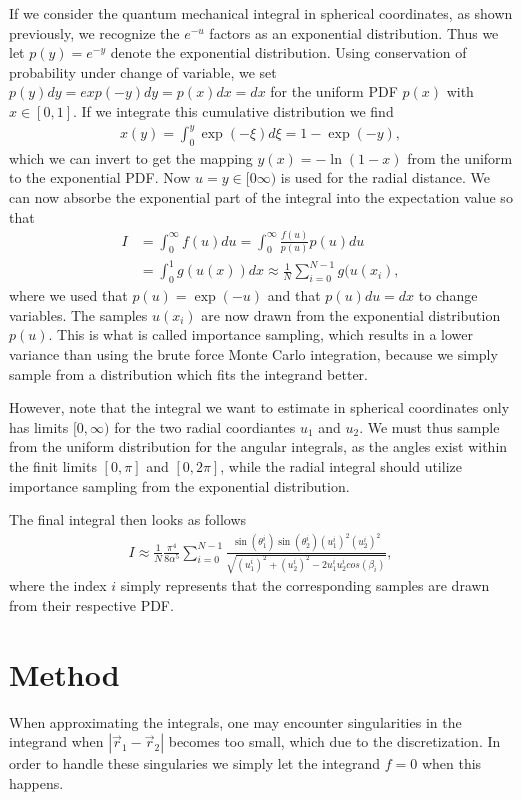 \documentclass[10pt, twocolumn]{aastex62}
\begin{document}
If we consider the quantum mechanical integral in spherical coordinates, as
shown previously, we recognize the $e^{-u}$ factors as an exponential
distribution. Thus we let $p(y) = e^{-y}$ denote the exponential distribution.
Using conservation of probability under change of variable, we set $p(y)dy =
exp(-y)dy = p(x)dx = dx$ for the uniform PDF $p(x)$ with $x\in[0,1]$. If we
integrate this cumulative distribution we find 
\begin{align}
	x(y) = \int^y_0 \exp(-\xi)d\xi = 1 - \exp(-y),
\end{align} 
which we can invert to get the mapping $y(x) = -\ln(1-x)$ from the uniform to
the exponential PDF. Now $u = y\in[0\infty)$ is used for the radial distance. We
can now absorbe the exponential part of the integral into the expectation value
so that 
\begin{align}
	I &= \int^\infty_0 f(u)du = \int_0^\infty \frac{f(u)}{p(u)}p(u)du \\
	&= \int^1_0 g(u(x))dx \approx \frac{1}{N}\sum_{i=0}^{N-1} g(u(x_i), 
\end{align}
where we used that $p(u) = \exp(-u)$ and that $p(u)du = dx$ to change variables.
The samples $u(x_i)$ are now drawn from the exponential distribution $p(u)$.
This is what is called importance sampling, which results in a lower variance
than using the brute force Monte Carlo integration, because we simply sample
from a distribution which fits the integrand better. 

However, note that the integral we want to estimate in spherical coordinates
only has limits $[0, \infty)$ for the two radial coordiantes $u_1$ and $u_2$. We
must thus sample from the uniform distribution for the angular integrals, as the
angles exist within the finit limits $[0,\pi]$ and $[0, 2\pi]$, while the radial
integral should utilize importance sampling from the exponential distribution.

The final integral then looks as follows
\begin{align}
	I \approx \frac{1}{N}\frac{\pi^4}{8\alpha^5}\sum^{N-1}_{i=0}\frac{\sin
	(\theta_1^i)\sin(\theta_2^i)(u_1^i)^2(u_2^i)^2}{\sqrt{(u_1^i)^2 + (u_2^i)^2 - 2u_1^iu_2^icos(\beta_i)}},
\end{align}
where the index $i$ simply represents that the corresponding samples are drawn
from their respective PDF.
\section{Method} \label{sec:method}
When approximating the integrals, one may encounter singularities in the
integrand when $|\vec{r}_1 - \vec{r}_2|$ becomes too small, which due to the
discretization. In order to handle these singularies we simply let the integrand
$f=0$ when this happens.
\end{document}
